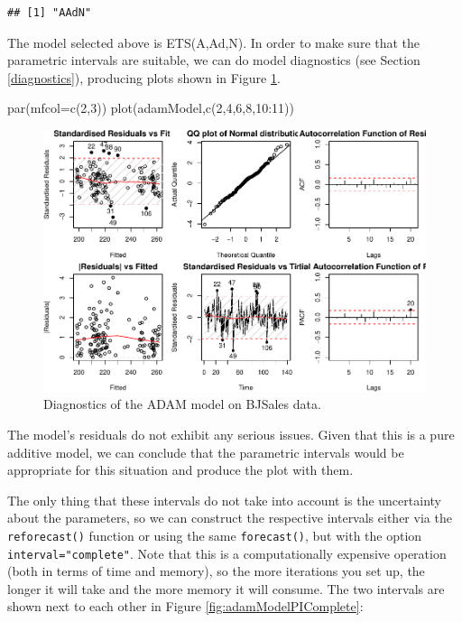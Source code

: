 \documentclass[
]{book}
\newenvironment{Shaded}{\begin{snugshade}}{\end{snugshade}}
\newcommand{\AttributeTok}[1]{\textcolor[rgb]{0.77,0.63,0.00}{#1}}
\newcommand{\DecValTok}[1]{\textcolor[rgb]{0.00,0.00,0.81}{#1}}
\newcommand{\FunctionTok}[1]{\textcolor[rgb]{0.00,0.00,0.00}{#1}}
\newcommand{\NormalTok}[1]{#1}
\newcommand{\SpecialCharTok}[1]{\textcolor[rgb]{0.00,0.00,0.00}{#1}}
\theoremstyle{definition}
\theoremstyle{definition}
\theoremstyle{definition}
\theoremstyle{definition}
\theoremstyle{remark}
\begin{document}
\begin{verbatim}
## [1] "AAdN"
\end{verbatim}

The model selected above is ETS(A,Ad,N). In order to make sure that the parametric intervals are suitable, we can do model diagnostics (see Section \ref{diagnostics}), producing plots shown in Figure \ref{fig:adamModelDiagnostics}.

\begin{Shaded}
\begin{Highlighting}[]
\FunctionTok{par}\NormalTok{(}\AttributeTok{mfcol=}\FunctionTok{c}\NormalTok{(}\DecValTok{2}\NormalTok{,}\DecValTok{3}\NormalTok{))}
\FunctionTok{plot}\NormalTok{(adamModel,}\FunctionTok{c}\NormalTok{(}\DecValTok{2}\NormalTok{,}\DecValTok{4}\NormalTok{,}\DecValTok{6}\NormalTok{,}\DecValTok{8}\NormalTok{,}\DecValTok{10}\SpecialCharTok{:}\DecValTok{11}\NormalTok{))}
\end{Highlighting}
\end{Shaded}

\begin{figure}
\centering
\includegraphics{Svetunkov--2022----ADAM_files/figure-latex/adamModelDiagnostics-1.pdf}
\caption{\label{fig:adamModelDiagnostics}Diagnostics of the ADAM model on BJSales data.}
\end{figure}

The model's residuals do not exhibit any serious issues. Given that this is a pure additive model, we can conclude that the parametric intervals would be appropriate for this situation and produce the plot with them.

The only thing that these intervals do not take into account is the uncertainty about the parameters, so we can construct the respective intervals either via the \texttt{reforecast()} function or using the same \texttt{forecast()}, but with the option \texttt{interval="complete"}. Note that this is a computationally expensive operation (both in terms of time and memory), so the more iterations you set up, the longer it will take and the more memory it will consume. The two intervals are shown next to each other in Figure \ref{fig:adamModelPIComplete}:
\end{document}
